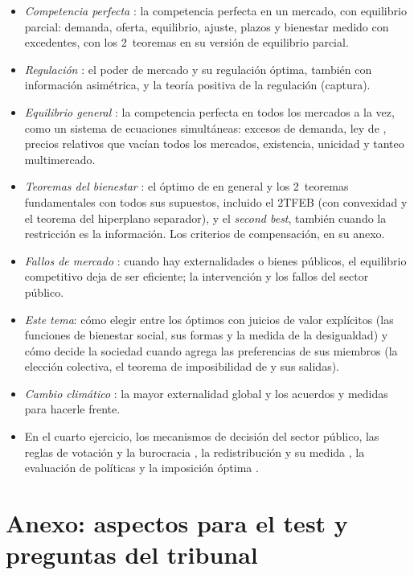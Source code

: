 \documentclass[11pt]{article}
\begin{document}
\begin{itemize}
\item \emph{Competencia perfecta} : la competencia perfecta en un mercado, con equilibrio parcial: demanda, oferta, equilibrio, ajuste, plazos y bienestar medido con excedentes, con los 2~teoremas en su versión de equilibrio parcial.
\item \emph{Regulación} : el poder de mercado y su regulación óptima, también con información asimétrica, y la teoría positiva de la regulación (captura).
\item \emph{Equilibrio general} : la competencia perfecta en todos los mercados a la vez, como un sistema de ecuaciones simultáneas: excesos de demanda, ley de , precios relativos que vacían todos los mercados, existencia, unicidad y tanteo multimercado.
\item \emph{Teoremas del bienestar} : el óptimo de  en general y los 2~teoremas fundamentales con todos sus supuestos, incluido el 2TFEB (con convexidad y el teorema del hiperplano separador), y el \emph{second best}, también cuando la restricción es la información. Los criterios de compensación, en su anexo.
\item \emph{Fallos de mercado} : cuando hay externalidades o bienes públicos, el equilibrio competitivo deja de ser eficiente; la intervención y los fallos del sector público.
\item \emph{Este tema}: cómo elegir entre los óptimos con juicios de valor explícitos (las funciones de bienestar social, sus formas y la medida de la desigualdad) y cómo decide la sociedad cuando agrega las preferencias de sus miembros (la elección colectiva, el teorema de imposibilidad de  y sus salidas).
\item \emph{Cambio climático} : la mayor externalidad global y los acuerdos y medidas para hacerle frente.
\item En el cuarto ejercicio, los mecanismos de decisión del sector público, las reglas de votación y la burocracia , la redistribución y su medida , la evaluación de políticas  y la imposición óptima .
\end{itemize}

\section{Anexo: aspectos para el test y preguntas del tribunal}\label{anexo:test}
\end{document}
